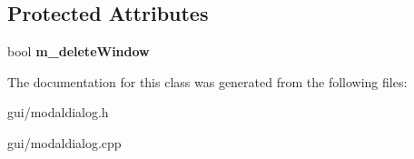 \subsection*{Protected Attributes}
\begin{DoxyCompactItemize}
\item 
bool {\bfseries m\+\_\+delete\+Window}\hypertarget{classQuestionDialog_ab971ff4d4b0373ffb3936f49c373e90b}{}\label{classQuestionDialog_ab971ff4d4b0373ffb3936f49c373e90b}

\end{DoxyCompactItemize}


The documentation for this class was generated from the following files\+:\begin{DoxyCompactItemize}
\item 
gui/modaldialog.\+h\item 
gui/modaldialog.\+cpp\end{DoxyCompactItemize}
